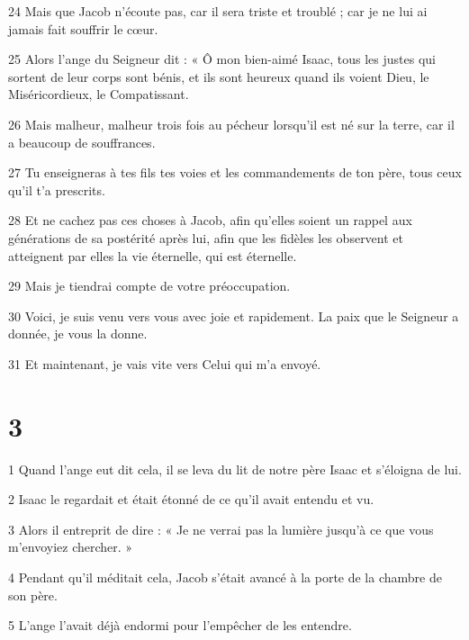 \par 24 Mais que Jacob n'écoute pas, car il sera triste et troublé ; car je ne lui ai jamais fait souffrir le cœur.

\par 25 Alors l'ange du Seigneur dit : « Ô mon bien-aimé Isaac, tous les justes qui sortent de leur corps sont bénis, et ils sont heureux quand ils voient Dieu, le Miséricordieux, le Compatissant.

\par 26 Mais malheur, malheur trois fois au pécheur lorsqu'il est né sur la terre, car il a beaucoup de souffrances.

\par 27 Tu enseigneras à tes fils tes voies et les commandements de ton père, tous ceux qu'il t'a prescrits.

\par 28 Et ne cachez pas ces choses à Jacob, afin qu'elles soient un rappel aux générations de sa postérité après lui, afin que les fidèles les observent et atteignent par elles la vie éternelle, qui est éternelle.

\par 29 Mais je tiendrai compte de votre préoccupation.

\par 30 Voici, je suis venu vers vous avec joie et rapidement. La paix que le Seigneur a donnée, je vous la donne.

\par 31 Et maintenant, je vais vite vers Celui qui m'a envoyé.

\chapter{3}

\par 1 Quand l'ange eut dit cela, il se leva du lit de notre père Isaac et s'éloigna de lui.

\par 2 Isaac le regardait et était étonné de ce qu'il avait entendu et vu.

\par 3 Alors il entreprit de dire : « Je ne verrai pas la lumière jusqu'à ce que vous m'envoyiez chercher. »

\par 4 Pendant qu'il méditait cela, Jacob s'était avancé à la porte de la chambre de son père.

\par 5 L'ange l'avait déjà endormi pour l'empêcher de les entendre.

